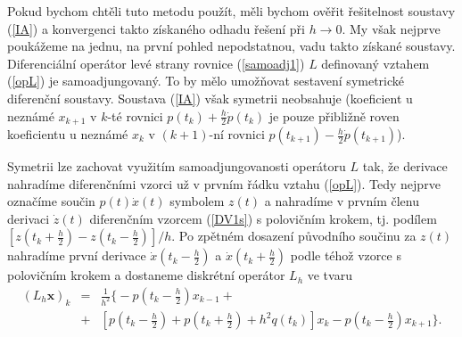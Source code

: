 \documentclass[a4paper, 12pt]{book}
\theoremstyle{definition}
\def\to{\rightarrow}
\def\vc#1{\mathbf{\boldsymbol{#1}}}     %
\begin{document}
Pokud bychom chtěli tuto metodu použít, měli bychom ověřit řešitelnost soustavy 
(\ref{IA}) a konvergenci takto získaného odhadu řešení při $h\to 0$. My 
však nejprve poukážeme na jednu, na první pohled nepodstatnou, vadu takto 
získané soustavy. Diferenciální operátor levé strany rovnice (\ref{samoadj1}) 
$L$ definovaný vztahem (\ref{opL}) je samoadjungovaný. To by mělo umožňovat 
sestavení symetrické diferenční soustavy. Soustava (\ref{IA}) však symetrii 
neobsahuje (koeficient u neznámé $x_{k+1}$ v $k$-té rovnici $p(t_k)+\frac h2
\dot p(t_k)$ je pouze přibližně roven koeficientu u neznámé $x_k$ v $(k+1)$-ní
rovnici $p(t_{k+1})-\frac h2 \dot p(t_{k+1})$).

Symetrii lze zachovat využitím samoadjungovanosti operátoru $L$ tak, že 
derivace nahradíme diferenčními vzorci už v prvním řádku vztahu (\ref{opL}). 
Tedy nejprve označíme součin $p(t)\dot x(t)$ symbolem $z(t)$ a nahradíme v prvním
členu derivaci $\dot z(t)$ diferenčním vzorcem (\ref{DV1s}) s polovičním krokem, 
tj. podílem $[z(t_k+\frac h2)-z(t_k-\frac h2)]/h$. Po zpětném dosazení 
původního součinu za $z(t)$ nahradíme první derivace $\dot x(t_k-\frac h2)$ a
$\dot x(t_k+\frac h2)$ podle téhož vzorce s polovičním krokem a dostaneme 
diskrétní operátor $L_h$ ve tvaru
\begin{equation}\label{opLh}
\begin{array}{rcl}
(L_h \vc x)_k&=&\frac 1{h^2}\Big\{-p(t_k-\frac h2)x_{k-1}+\\
&+&[p(t_k-\frac h2)+p(t_k+\frac h2)+h^2q(t_k)]x_k-p(t_k-\frac h2)x_{k+1}\Big\}.
\end{array}
\end{equation}
\end{document}
